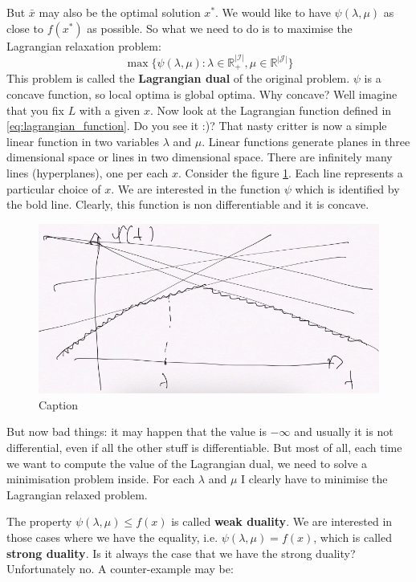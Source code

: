 But $\bar{x}$ may also be the optimal solution $x^*$. We would like to have $\psi(\lambda, \mu)$ as close to $f(x^*)$ as possible. So what we need to do is to maximise the Lagrangian relaxation problem:
\begin{equation}
    \max \{\psi(\lambda,\mu) : \lambda \in \mathbb{R}_+^{|\mathcal{I}|}, \mu \in \mathbb{R}^{|\mathcal{J}|}\}
\end{equation}
This problem is called the \textbf{Lagrangian dual} of the original problem. $\psi$ is a concave function, so local optima is global optima. Why concave? Well imagine that you fix $L$ with a given $x$. Now look at the Lagrangian function defined in \ref{eq:lagrangian_function}. Do you see it :)? That nasty critter is now a simple linear function in two variables $\lambda$ and $\mu$. Linear functions generate planes in three dimensional space or lines in two dimensional space. There are infinitely many lines (hyperplanes), one per each $x$. Consider the figure \ref{fig:chapter3-lagrangian_lines}. Each line represents a particular choice of $x$. We are interested in the function $\psi$ which is identified by the bold line. Clearly, this function is non differentiable and it is concave.
\begin{figure}
    \centering
    \includegraphics[scale=0.4]{figures/3/chapter3-lagrangian_lines.png}
    \caption{Caption}
    \label{fig:chapter3-lagrangian_lines}
\end{figure}
\par But now bad things: it may happen that the value is $-\infty$ and usually it is not differential, even if all the other stuff is differentiable. But most of all, each time we want to compute the value of the Lagrangian dual, we need to solve a minimisation problem inside. For each $\lambda$ and $\mu$ I clearly have to minimise the Lagrangian relaxed problem.
\par The property $\psi(\lambda,\mu) \leq f(x)$ is called \textbf{weak duality}. We are interested in those cases where we have the equality, i.e. $\psi(\lambda,\mu) = f(x)$, which is called \textbf{strong duality}. Is it always the case that we have the strong duality? Unfortunately no. A counter-example may be:
